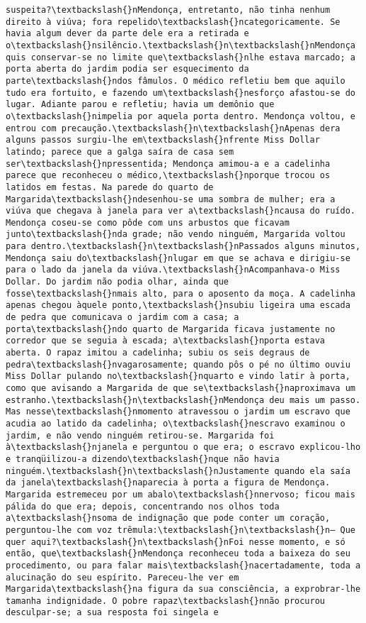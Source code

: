 \documentclass[11pt]{article}
\begin{document}
\begin{Verbatim}[commandchars=\\\{\}]
suspeita?\textbackslash{}nMendonça, entretanto, não tinha nenhum direito à viúva; fora repelido\textbackslash{}ncategoricamente. Se havia algum dever da parte dele era a retirada e o\textbackslash{}nsilêncio.\textbackslash{}n\textbackslash{}nMendonça quis conservar-se no limite que\textbackslash{}nlhe estava marcado; a porta aberta do jardim podia ser esquecimento da parte\textbackslash{}ndos fâmulos. O médico refletiu bem que aquilo tudo era fortuito, e fazendo um\textbackslash{}nesforço afastou-se do lugar. Adiante parou e refletiu; havia um demônio que o\textbackslash{}nimpelia por aquela porta dentro. Mendonça voltou, e entrou com precaução.\textbackslash{}n\textbackslash{}nApenas dera alguns passos surgiu-lhe em\textbackslash{}nfrente Miss Dollar latindo; parece que a galga saíra de casa sem ser\textbackslash{}npressentida; Mendonça amimou-a e a cadelinha parece que reconheceu o médico,\textbackslash{}nporque trocou os latidos em festas. Na parede do quarto de Margarida\textbackslash{}ndesenhou-se uma sombra de mulher; era a viúva que chegava à janela para ver a\textbackslash{}ncausa do ruído. Mendonça coseu-se como pôde com uns arbustos que ficavam junto\textbackslash{}nda grade; não vendo ninguém, Margarida voltou para dentro.\textbackslash{}n\textbackslash{}nPassados alguns minutos, Mendonça saiu do\textbackslash{}nlugar em que se achava e dirigiu-se para o lado da janela da viúva.\textbackslash{}nAcompanhava-o Miss Dollar. Do jardim não podia olhar, ainda que fosse\textbackslash{}nmais alto, para o aposento da moça. A cadelinha apenas chegou àquele ponto,\textbackslash{}nsubiu ligeira uma escada de pedra que comunicava o jardim com a casa; a porta\textbackslash{}ndo quarto de Margarida ficava justamente no corredor que se seguia à escada; a\textbackslash{}nporta estava aberta. O rapaz imitou a cadelinha; subiu os seis degraus de pedra\textbackslash{}nvagarosamente; quando pôs o pé no último ouviu Miss Dollar pulando no\textbackslash{}nquarto e vindo latir à porta, como que avisando a Margarida de que se\textbackslash{}naproximava um estranho.\textbackslash{}n\textbackslash{}nMendonça deu mais um passo. Mas nesse\textbackslash{}nmomento atravessou o jardim um escravo que acudia ao latido da cadelinha; o\textbackslash{}nescravo examinou o jardim, e não vendo ninguém retirou-se. Margarida foi à\textbackslash{}njanela e perguntou o que era; o escravo explicou-lho e tranqüilizou-a dizendo\textbackslash{}nque não havia ninguém.\textbackslash{}n\textbackslash{}nJustamente quando ela saía da janela\textbackslash{}naparecia à porta a figura de Mendonça. Margarida estremeceu por um abalo\textbackslash{}nnervoso; ficou mais pálida do que era; depois, concentrando nos olhos toda a\textbackslash{}nsoma de indignação que pode conter um coração, perguntou-lhe com voz trêmula:\textbackslash{}n\textbackslash{}n— Que quer aqui?\textbackslash{}n\textbackslash{}nFoi nesse momento, e só então, que\textbackslash{}nMendonça reconheceu toda a baixeza do seu procedimento, ou para falar mais\textbackslash{}nacertadamente, toda a alucinação do seu espírito. Pareceu-lhe ver em Margarida\textbackslash{}na figura da sua consciência, a exprobrar-lhe tamanha indignidade. O pobre rapaz\textbackslash{}nnão procurou desculpar-se; a sua resposta foi singela e 
\end{Verbatim}
\end{document}
